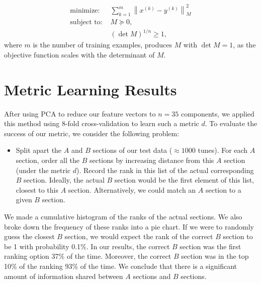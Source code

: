 \documentclass{article} %
\newcommand{\vectornorm}[1]{\left\| #1 \right\|}
\begin{document}
\begin{align*} 
\text{minimize: } & \sum_{k=1}^m \vectornorm{x^{(k)} - y^{(k)}}_M^2 \\
\text{subject to: }
& M \succeq 0, \\
& (\det M)^{1/n} \ge 1,
\end{align*} 
where $m$ is the number of training examples, produces $M$ with $\det M = 1$, as
the objective function scales with the determinant of $M$.

\section{Metric Learning Results}

After using PCA to reduce our feature vectors to $n = 35$ components, we applied
this method using 8-fold cross-validation to learn such a metric $d$. To
evaluate the success of our metric, we consider the following problem:
\begin{itemize}
\item[] Split apart the $A$ and $B$ sections of our test data ($\approx 1000$
tunes). For each $A$ section, order all the $B$ sections by increasing distance
from this $A$ section (under the metric $d$). Record the rank in this list of
the actual corresponding $B$ section. Ideally, the actual $B$ section would be
the first element of this list, closest to this $A$ section. Alternatively, we
could match an $A$ section to a given $B$ section.
\end{itemize}
We made a cumulative histogram of the ranks of the actual sections.%
We also broke down the frequency of these ranks into a pie chart. %
If we were to randomly guess the closest $B$ section, we would expect the rank
of the correct $B$ section to be 1 with probability 0.1\%. In our results, the
correct $B$ section was the first ranking option 37\% of the time. Moreover, the
correct $B$ section was in the top 10\% of the ranking 93\% of the time. We
conclude that there is a significant amount of information shared between $A$
sections and $B$ sections.
\end{document}

